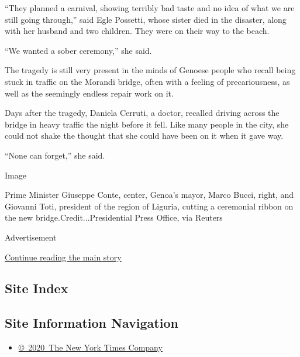 ``They planned a carnival, showing terribly bad taste and no idea of
what we are still going through,'' said Egle Possetti, whose sister died
in the disaster, along with her husband and two children. They were on
their way to the beach.

``We wanted a sober ceremony,'' she said.

The tragedy is still very present in the minds of Genoese people who
recall being stuck in traffic on the Morandi bridge, often with a
feeling of precariousness, as well as the seemingly endless repair work
on it.

Days after the tragedy, Daniela Cerruti, a doctor, recalled driving
across the bridge in heavy traffic the night before it fell. Like many
people in the city, she could not shake the thought that she could have
been on it when it gave way.

``None can forget,'' she said.

Image

Prime Minister Giuseppe Conte, center, Genoa's mayor, Marco Bucci,
right, and Giovanni Toti, president of the region of Liguria, cutting a
ceremonial ribbon on the new bridge.Credit...Presidential Press Office,
via Reuters

Advertisement

\protect\hyperlink{after-bottom}{Continue reading the main story}

\hypertarget{site-index}{%
\subsection{Site Index}\label{site-index}}

\hypertarget{site-information-navigation}{%
\subsection{Site Information
Navigation}\label{site-information-navigation}}

\begin{itemize}
\tightlist
\item
  \href{https://help.nytimes.com/hc/en-us/articles/115014792127-Copyright-notice}{©~2020~The
  New York Times Company}
\end{itemize}


